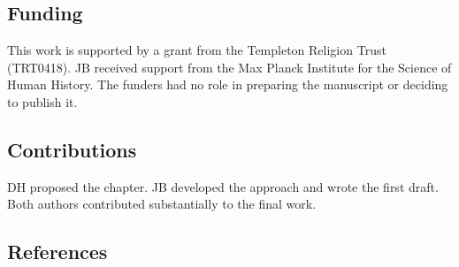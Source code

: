 \documentclass[
  singlecolumn]{article}
\begin{document}
\newpage{}

\subsection{Funding}\label{funding}

This work is supported by a grant from the Templeton Religion Trust
(TRT0418). JB received support from the Max Planck Institute for the
Science of Human History. The funders had no role in preparing the
manuscript or deciding to publish it.

\subsection{Contributions}\label{contributions}

DH proposed the chapter. JB developed the approach and wrote the first
draft. Both authors contributed substantially to the final work.

\newpage{}

\subsection{References}\label{references}
\end{document}
